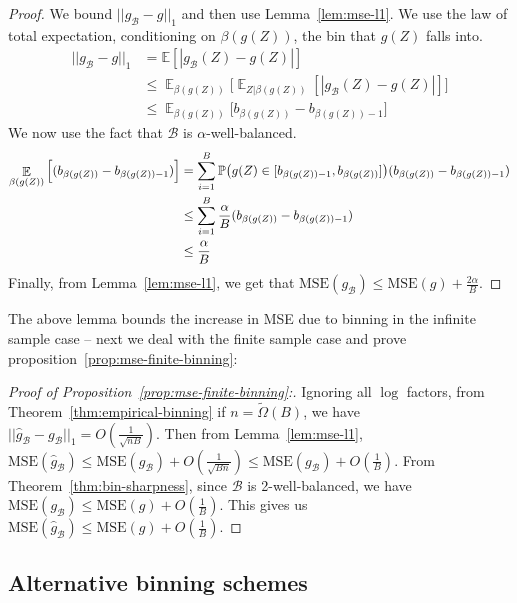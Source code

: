 \begin{proof}
We bound $||g_{\mathcal{B}} - g||_1$ and then use Lemma~\ref{lem:mse-l1}. We use the law of total expectation, conditioning on $\beta(g(Z))$, the bin that $g(Z)$ falls into.
\begin{align*}
||g_{\mathcal{B}} - g||_1 &= \mathbb{E}[|g_{\mathcal{B}}(Z) - g(Z)|] \\
&\leq \mathop{\mathbb{E}}_{\beta(g(Z))} \Big[ \mathop{\mathbb{E}}_{Z | \beta(g(Z))} [ |g_{\mathcal{B}}(Z) - g(Z)| ]\Big]\\
&\leq \mathop{\mathbb{E}}_{\beta(g(Z))} \Big[ b_{\beta(g(Z))} - b_{\beta(g(Z))-1}\Big]
\end{align*}
We now use the fact that $\mathcal{B}$ is $\alpha$-well-balanced.
\begin{align*}
\mathop{\mathbb{E}}_{\beta(g(Z))} \Big[ (b_{\beta(g(Z))} - b_{\beta(g(Z))-1})\Big] &= \sum_{i=1}^B \mathbb{P}\big(g(Z) \in [b_{\beta(g(Z))-1}, b_{\beta(g(Z))}]\big) (b_{\beta(g(Z))} - b_{\beta(g(Z))-1}) \\
&\leq \sum_{i=1}^B \frac{\alpha}{B} (b_{\beta(g(Z))} - b_{\beta(g(Z))-1}) \\
&\leq \frac{\alpha}{B}
\end{align*}
Finally, from Lemma~\ref{lem:mse-l1}, we get that $\mbox{MSE}(g_{\mathcal{B}}) \leq \mbox{MSE}(g) + \frac{2\alpha}{B}$.
\end{proof}

The above lemma bounds the increase in MSE due to binning in the infinite sample case -- next we deal with the finite sample case and prove proposition~\ref{prop:mse-finite-binning}:

\begin{proof}[Proof of Proposition~\ref{prop:mse-finite-binning}:]
Ignoring all $\log$ factors, from Theorem~\ref{thm:empirical-binning} if $n = \widetilde{\Omega}(B)$, we have $||\hat{g}_{\mathcal{B}} - g_{\mathcal{B}}||_1 = O(\frac{1}{\sqrt{nB}})$. Then from  Lemma~\ref{lem:mse-l1}, $\mbox{MSE}(\hat{g}_{\mathcal{B}}) \leq \mbox{MSE}(g_{\mathcal{B}}) + O(\frac{1}{\sqrt{Bn}}) \leq \mbox{MSE}(g_{\mathcal{B}}) + O(\frac{1}{B})$. From Theorem~\ref{thm:bin-sharpness}, since $\mathcal{B}$ is 2-well-balanced, we have  $\mbox{MSE}(g_{\mathcal{B}}) \leq \mbox{MSE}(g) + O(\frac{1}{B})$. This gives us $\mbox{MSE}(\hat{g}_{\mathcal{B}}) \leq \mbox{MSE}(g) + O(\frac{1}{B})$.
\end{proof}

\subsection{Alternative binning schemes}
\label{sec:alt_binning_schemes}

